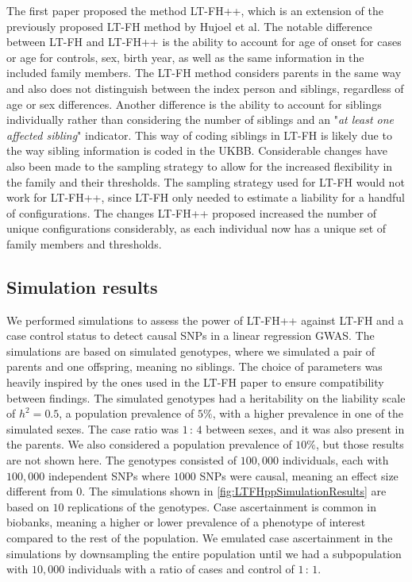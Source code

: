 The first paper proposed the method LT-FH++, which is an extension of the previously proposed LT-FH method by Hujoel et 
al\cite{hujoel2020liability}. The notable difference between LT-FH and LT-FH++ is the ability to account for age of onset for cases or 
age for controls, sex, birth year, as well as the same information in the included family members. The LT-FH method considers parents 
in the same way and also does not distinguish between the index person and siblings, regardless of age or sex differences. Another 
difference is the ability to account for siblings individually rather than considering the number of siblings and an "\textit{at least 
one affected sibling}" indicator. This way of coding siblings in LT-FH is likely due to the way sibling information is coded in the 
UKBB. Considerable changes have also been made to the sampling strategy to allow for the increased flexibility in the family and their 
thresholds. The sampling strategy used for LT-FH would not work for LT-FH++, since LT-FH only needed to estimate a liability for a 
handful of configurations. The changes LT-FH++ proposed increased the number of unique configurations considerably, as each individual 
now has a unique set of family members and thresholds. 

\subsection{Simulation results}
We performed simulations to assess the power of LT-FH++ against LT-FH and a case control status to detect causal SNPs in a linear 
regression GWAS. The simulations are based on simulated genotypes, where we simulated a pair of parents and one offspring, meaning no 
siblings. The choice of parameters was heavily inspired by the ones used in the LT-FH paper to ensure compatibility between findings. 
The simulated genotypes had a heritability on the liability scale of $ h^2 = 0.5 $, a population prevalence of $ 5\% $, with a higher 
prevalence in one of the simulated sexes. The case ratio was $ 1{\,:\,}4 $ between sexes, and it was also present in the parents. We 
also considered a population prevalence of $ 10\% $, but those results are not shown here. The genotypes consisted of $ 100,000 $ 
individuals, each with $ 100,000 $ independent SNPs where $ 1000 $ SNPs were causal, meaning an effect size different from $ 0 $. The 
simulations shown in \cref{fig:LTFHppSimulationResults} are based on $ 10 $ replications of the genotypes. Case ascertainment is 
common in biobanks, meaning a higher or lower prevalence of a phenotype of interest compared to the rest of the population. We 
emulated case ascertainment in the simulations by downsampling the entire population until we had a subpopulation with $ 10,000 $ 
individuals with a ratio of cases and control of $ 1{\,:\,}1 $.

